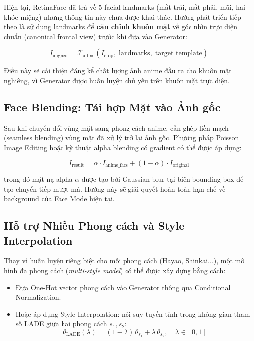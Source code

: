 Hiện tại, RetinaFace đã trả về 5 facial landmarks (mắt trái, mắt phải, mũi, hai khóe miệng) nhưng thông tin này chưa được khai thác. Hướng phát triển tiếp theo là sử dụng landmarks để \textbf{căn chỉnh khuôn mặt} về góc nhìn trực diện chuẩn (canonical frontal view) trước khi đưa vào Generator:

\begin{equation}
\label{eq:face_align}
I_{\text{aligned}} = \mathcal{T}_{\text{affine}}\!\left(I_{\text{crop}},\; \text{landmarks},\; \text{target\_template}\right)
\end{equation}

Điều này sẽ cải thiện đáng kể chất lượng ảnh anime đầu ra cho khuôn mặt nghiêng, vì Generator được huấn luyện chủ yếu trên khuôn mặt trực diện.

\subsection{Face Blending: Tái hợp Mặt vào Ảnh gốc}
\label{subsec:future_blending}

Sau khi chuyển đổi vùng mặt sang phong cách anime, cần ghép liền mạch (seamless blending) vùng mặt đã xử lý trở lại ảnh gốc. Phương pháp Poisson Image Editing \cite{Perez2003Poisson} hoặc kỹ thuật alpha blending có gradient có thể được áp dụng:

\begin{equation}
\label{eq:face_blend}
I_{\text{result}} = \alpha \cdot I_{\text{anime\_face}} + (1-\alpha) \cdot I_{\text{original}}
\end{equation}

trong đó mặt nạ alpha $\alpha$ được tạo bởi Gaussian blur tại biên bounding box để tạo chuyển tiếp mượt mà. Hướng này sẽ giải quyết hoàn toàn hạn chế về background của Face Mode hiện tại.

\subsection{Hỗ trợ Nhiều Phong cách và Style Interpolation}
\label{subsec:future_multistyle}

Thay vì huấn luyện riêng biệt cho mỗi phong cách (Hayao, Shinkai...), một mô hình đa phong cách (\textit{multi-style model}) có thể được xây dựng bằng cách:
\begin{itemize}
    \item Đưa One-Hot vector phong cách vào Generator thông qua Conditional Normalization.
    \item Hoặc áp dụng Style Interpolation: nội suy tuyến tính trong không gian tham số LADE giữa hai phong cách $s_1, s_2$:
    \begin{equation}
    \label{eq:style_interp}
    \theta_{\text{LADE}}(\lambda) = (1-\lambda)\,\theta_{s_1} + \lambda\,\theta_{s_2}, \quad \lambda \in [0,1]
    \end{equation}
\end{itemize}

